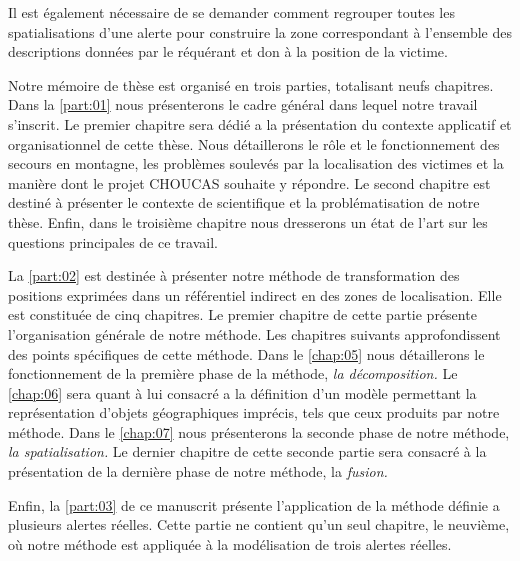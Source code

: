 
Il est également nécessaire de se demander comment regrouper toutes
les spatialisations d'une alerte pour construire la zone correspondant
à l'ensemble des descriptions données par le réquérant et don à la
position de la victime.










Notre mémoire de thèse est organisé en trois parties, totalisant neufs
chapitres. Dans la \autoref{part:01} nous présenterons le cadre
général dans lequel notre travail s'inscrit. Le premier chapitre sera
dédié a la présentation du contexte applicatif et organisationnel de
cette thèse. Nous détaillerons le rôle et le fonctionnement des
secours en montagne, les problèmes soulevés par la localisation des
victimes et la manière dont le projet CHOUCAS souhaite y répondre. Le
second chapitre est destiné à présenter le contexte de scientifique et
la problématisation de notre thèse. Enfin, dans le troisième chapitre
nous dresserons un état de l'art sur les questions principales de ce
travail.

La \autoref{part:02} est destinée à présenter notre méthode de
transformation des positions exprimées dans un référentiel indirect en
des zones de localisation. Elle est constituée de cinq chapitres. Le
premier chapitre de cette partie présente l’organisation générale de
notre méthode. Les chapitres suivants approfondissent des points
spécifiques de cette méthode. Dans le \autoref{chap:05} nous
détaillerons le fonctionnement de la première phase de la méthode,
\emph{la décomposition.} Le \autoref{chap:06} sera quant à lui
consacré a la définition d'un modèle permettant la représentation
d'objets géographiques imprécis, tels que ceux produits par notre
méthode. Dans le \autoref{chap:07} nous présenterons la seconde phase
de notre méthode, \emph{la spatialisation.} Le dernier chapitre de
cette seconde partie sera consacré à la présentation de la dernière
phase de notre méthode, la \emph{fusion.}

Enfin, la \autoref{part:03} de ce manuscrit présente l’application de
la méthode définie a plusieurs alertes réelles. Cette partie ne
contient qu'un seul chapitre, le neuvième, où notre méthode est
appliquée à la modélisation de trois alertes réelles.



